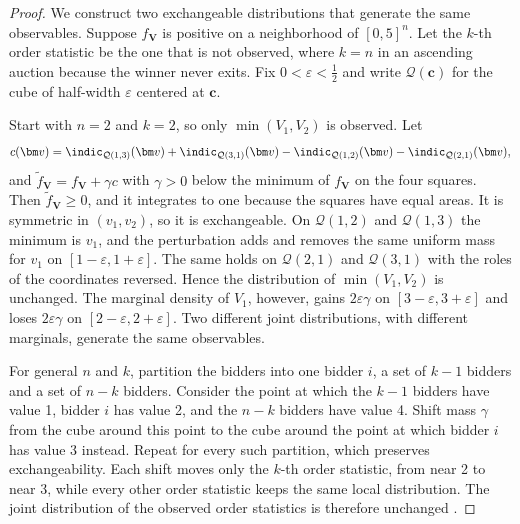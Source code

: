 \begin{proof}
We construct two exchangeable distributions that generate the same observables. Suppose $f_{\bm V}$ is positive on a
neighborhood of $[0,5]^n$. Let the $k$-th order statistic be the one that is not observed, where $k=n$ in an
ascending auction because the winner never exits. Fix $0<\varepsilon<\frac12$ and write $\mathcal Q(\bm c)$ for the
cube of half-width $\varepsilon$ centered at $\bm c$.

Start with $n=2$ and $k=2$, so only $\min(V_1,V_2)$ is observed. Let
\[
c(\bm v)=\indic_{\mathcal Q(1,3)}(\bm v)+\indic_{\mathcal Q(3,1)}(\bm v)-\indic_{\mathcal Q(1,2)}(\bm v)-\indic_{\mathcal Q(2,1)}(\bm v),
\]
and $\tilde f_{\bm V}=f_{\bm V}+\gamma c$ with $\gamma>0$ below the minimum of $f_{\bm V}$ on the four squares. Then
$\tilde f_{\bm V}\ge0$, and it integrates to one because the squares have equal areas. It is symmetric in $(v_1,v_2)$,
so it is exchangeable. On $\mathcal Q(1,2)$ and $\mathcal Q(1,3)$ the minimum is $v_1$, and the perturbation adds and
removes the same uniform mass for $v_1$ on $[1-\varepsilon,1+\varepsilon]$. The same holds on $\mathcal Q(2,1)$ and
$\mathcal Q(3,1)$ with the roles of the coordinates reversed. Hence the distribution of $\min(V_1,V_2)$ is unchanged.
The marginal density of $V_1$, however, gains $2\varepsilon\gamma$ on $[3-\varepsilon,3+\varepsilon]$ and loses
$2\varepsilon\gamma$ on $[2-\varepsilon,2+\varepsilon]$. Two different joint distributions, with different
marginals, generate the same observables.

For general $n$ and $k$, partition the bidders into one bidder $i$, a set of $k-1$ bidders and a set of $n-k$ bidders.
Consider the point at which the $k-1$ bidders have value 1, bidder $i$ has value 2, and the $n-k$ bidders have value
4. Shift mass $\gamma$ from the cube around this point to the cube around the point at which bidder $i$ has value 3
instead. Repeat for every such partition, which preserves exchangeability. Each shift moves only the $k$-th order statistic, from near 2
to near 3, while every other order statistic keeps the same local distribution. The joint distribution of the
observed order statistics is therefore unchanged \citep[proof of Theorem~4]{AtheyHaile2002}.
\end{proof}

